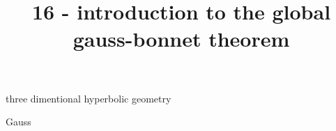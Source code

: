 \documentclass{article}
\title{16 - introduction to the global gauss-bonnet theorem}
\newenvironment{andrew_section}[1]
    {
    \section{#1}
    \begin{itemize}
    }
    {
    \end{itemize}
    }
\begin{document}
\maketitle

\begin{andrew_section}{three dimentional hyperbolic geometry}
    \item 
        Gauss
\end{andrew_section}
\end{document}
